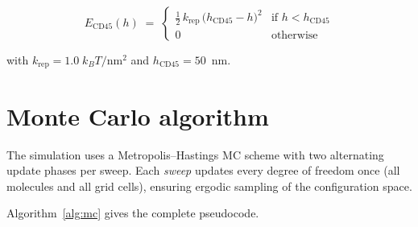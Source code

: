 \documentclass[11pt,a4paper]{article}
\begin{document}
\begin{equation}
  \label{eq:cd45}
  E_\text{CD45}(h) \;=\;
    \begin{cases}
      \displaystyle\frac{1}{2}\,k_\text{rep}\,
        \bigl(h_\text{CD45} - h\bigr)^2
        & \text{if } h < h_\text{CD45} \\[6pt]
      0 & \text{otherwise}
    \end{cases}
\end{equation}

\noindent
with $k_\text{rep} = 1.0\;k_BT/\text{nm}^2$ and
$h_\text{CD45} = 50$~nm.


\section{Monte Carlo algorithm}
\label{sec:mcmc}

The simulation uses a Metropolis--Hastings MC scheme with two
alternating update phases per sweep.  Each \emph{sweep} updates every
degree of freedom once (all molecules and all grid cells), ensuring
ergodic sampling of the configuration space.

Algorithm~\ref{alg:mc} gives the complete pseudocode.
\end{document}
